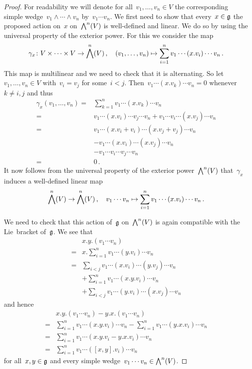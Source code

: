 \begin{proof}
  For readability we will denote for all~$v_1, \dotsc, v_n \in V$ the corresponding simple wedge~$v_1 \wedge \dotsb \wedge v_n$ by~$v_1 \dotsm v_n$.
  We first need to show that every~$x \in \mathfrak{g}$ the proposed action on~$x$ on~$\exterior[n]{V}$ is well-defined and linear.
  We do so by using the universal property of the exterior power.
  For this we consider the map
  \[
    \gamma_x
    \colon
    V \times \dotsb \times V
    \to
    \exterior[n]{V} \,,
    \quad
    (v_1, \dotsc, v_n)
    \mapsto
    \sum_{i=1}^n v_1 \dotsm (x.v_i) \dotsm v_n  \,.
  \]
  This map is multilinear and we need to check that it is alternating.
  So let~$v_1, \dotsc, v_n \in V$ with~$v_i = v_j$ for some~$i < j$.
  Then~$v_1 \dotsm (x.v_k) \dotsm v_n = 0$ whenever~$k \neq i,j$ and thus
  \begin{align*}
    \gamma_x(v_1, \dotsc, v_n)
    ={}&
    \sum_{k=1}^n v_1 \dotsm (x.v_k) \dotsm v_n
    \\
    ={}&
      v_1 \dotsm (x.v_i) \dotsm v_j \dotsm v_n
    + v_1 \dotsm v_i \dotsm (x.v_j) \dotsm v_n
    \\
    ={}&
      v_1 \dotsm (x.v_i + v_i) \dotsm (x.v_j + v_j) \dotsm v_n
    \\
    {}&
    - v_1 \dotsm (x.v_i) \dotsm (x.v_j) \dotsm v_n
    \\
    {}&
    - v_1 \dotsm v_i \dotsm v_j \dotsm v_n
    \\
    ={}&
    0 \,.
  \end{align*}
  It now follows from the universal property of the exterior power~$\exterior[n]{V}$ that~$\gamma_x$ induces a well-defined linear map
  \[
    \exterior[n]{V}
    \to
    \exterior[n]{V} \,,
    \quad
    v_1 \dotsm v_n
    \mapsto
    \sum_{i=1}^n v_1 \dotsb (x.v_i) \dotsb v_n  \,.
  \]

  We need to check that this action of~$\mathfrak{g}$ on~$\exterior[n]{V}$ is again compatible with the Lie~bracket of~$\mathfrak{g}$.
  We see that
  \begin{align*}
    {}&
    x.y.(v_1 \dotsm v_n)
    \\
    ={}&
    x. \sum_{i=1}^n v_1 \dotsm (y.v_i) \dotsm v_n
    \\
    ={}&
    \sum_{i < j}  v_1 \dotsm (x.v_i) \dotsm (y.v_j) \dotsm v_n
    \\
    {}&
    + \sum_{i=1}^n  v_1 \dotsm (x.y.v_i) \dotsm v_n
    \\
    {}&
    + \sum_{i < j}  v_1 \dotsm (y.v_i) \dotsm (x.v_j) \dotsm v_n
  \end{align*}
  and hence
  \begin{align*}
    {}&
    x.y.(v_1 \dotsm v_n) - y.x.(v_1 \dotsm v_n)
    \\
    ={}&
    \sum_{i=1}^n  v_1 \dotsm (x.y.v_i) \dotsm v_n
    -
    \sum_{i=1}^n  v_1 \dotsm (y.x.v_i) \dotsm v_n
    \\
    ={}&
    \sum_{i=1}^n  v_1 \dotsm (x.y.v_i - y.x.v_i) \dotsm v_n
    \\
    ={}&
    \sum_{i=1}^n  v_1  \dotsm ([x,y].v_i) \dotsm v_n
  \end{align*}
  for all~$x, y \in \mathfrak{g}$ and every simple wedge~$v_1 \dotsm v_n \in \exterior[n]{V}$.
\end{proof}

